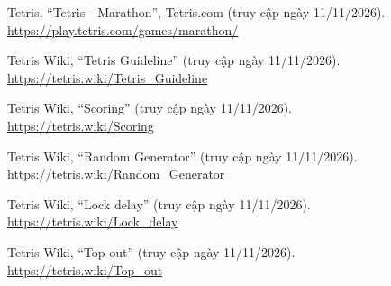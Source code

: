 
Tetris, ``Tetris - Marathon'', Tetris.com
(truy cập ngày 11/11/2026).\\
\url{https://play.tetris.com/games/marathon/}

Tetris Wiki, ``Tetris Guideline''
(truy cập ngày 11/11/2026).\\
\url{https://tetris.wiki/Tetris_Guideline}

Tetris Wiki, ``Scoring''
(truy cập ngày 11/11/2026).\\
\url{https://tetris.wiki/Scoring}

Tetris Wiki, ``Random Generator''
(truy cập ngày 11/11/2026).\\
\url{https://tetris.wiki/Random_Generator}

Tetris Wiki, ``Lock delay''
(truy cập ngày 11/11/2026).\\
\url{https://tetris.wiki/Lock_delay}

Tetris Wiki, ``Top out''
(truy cập ngày 11/11/2026).\\
\url{https://tetris.wiki/Top_out}
